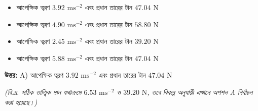 \documentclass[12pt, a4paper]{article}
\begin{document}
\begin{center}
\end{center}
\vspace{1em}

\begin{itemize}[label={}, leftmargin=1cm, itemsep=0.5em]
    \item[\textbf{A)}] আপেক্ষিক ত্বরণ $3.92\text{ ms}^{-2}$ এবং প্রধান তারের টান $47.04\text{ N}$
    \item[\textbf{B)}] আপেক্ষিক ত্বরণ $4.90\text{ ms}^{-2}$ এবং প্রধান তারের টান $58.80\text{ N}$
    \item[\textbf{C)}] আপেক্ষিক ত্বরণ $2.45\text{ ms}^{-2}$ এবং প্রধান তারের টান $39.20\text{ N}$
    \item[\textbf{D)}] আপেক্ষিক ত্বরণ $5.88\text{ ms}^{-2}$ এবং প্রধান তারের টান $47.04\text{ N}$
\end{itemize}

\vspace{0.5em}
\begin{tcolorbox}[answerbox]
    \textbf{\color{success} উত্তর:} A) আপেক্ষিক ত্বরণ $3.92\text{ ms}^{-2}$ এবং প্রধান তারের টান $47.04\text{ N}$ 
    
    \textit{\footnotesize (বি.দ্র. সঠিক তাত্ত্বিক মান যথাক্রমে $6.53\text{ ms}^{-2}$ ও $39.20\text{ N}$, তবে বিকল্প অনুযায়ী এখানে অপশন A নির্বাচন করা হয়েছে।)}
\end{tcolorbox}
\vspace{1em}
\end{document}

